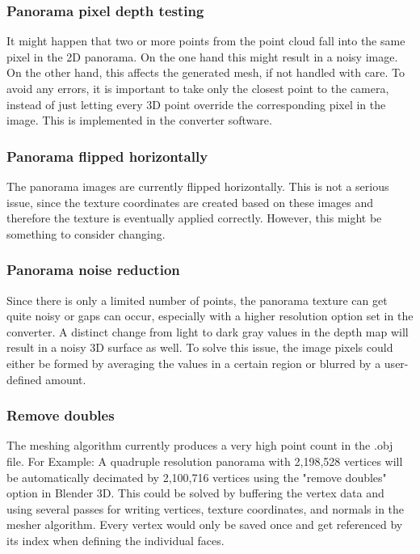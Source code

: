 \subsubsection{Panorama pixel depth testing}

It might happen that two or more points from the point cloud fall into the same pixel in the 2D panorama. On the one hand this might result in a noisy image. On the other hand, this affects the generated mesh, if not handled with care. To avoid any errors, it is important to take only the closest point to the camera, instead of just letting every 3D point override the corresponding pixel in the image. This is implemented in the converter software.

\subsubsection{Panorama flipped horizontally}

The panorama images are currently flipped horizontally. This is not a serious issue, since the texture coordinates are created based on these images and therefore the texture is eventually applied correctly. However, this might be something to consider changing.

\subsubsection{Panorama noise reduction}

Since there is only a limited number of points, the panorama texture can get quite noisy or gaps can occur, especially with a higher resolution option set in the converter. A distinct change from light to dark gray values in the depth map will result in a noisy 3D surface as well.
To solve this issue, the image pixels could either be formed by averaging the values in a certain region or blurred by a user-defined amount.

\subsubsection{Remove doubles}

The meshing algorithm currently produces a very high point count in the .obj file. For Example: A quadruple resolution panorama with 2,198,528 vertices will be automatically decimated by 2,100,716 vertices using the "remove doubles" option in Blender 3D.
This could be solved by buffering the vertex data and using several passes for writing vertices, texture coordinates, and normals in the mesher algorithm. Every vertex would only be saved once and get referenced by its index when defining the individual faces.

